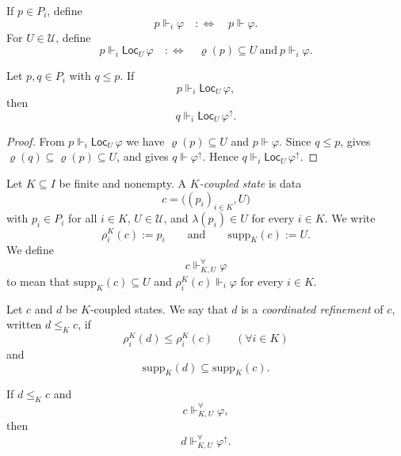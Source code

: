 \begin{definition}\label{def:regional-forcing}
If $p\in P_i$, define
\[
p\Vdash_i\varphi
\quad:\Longleftrightarrow\quad
p\Vdash\varphi.
\]
For $U\in\mathcal{U}$, define
\[
p\Vdash_i \mathsf{Loc}_U\,\varphi
\quad:\Longleftrightarrow\quad
\varrho(p)\subseteq U\ \text{and}\ p\Vdash_i\varphi.
\]
\end{definition}

\begin{proposition}\label{prop:regional-forcing-persistence}
Let $p,q\in P_i$ with $q\le p$. If
\[
p\Vdash_i \mathsf{Loc}_U\,\varphi,
\]
then
\[
q\Vdash_i \mathsf{Loc}_U\,\varphi^\uparrow.
\]
\end{proposition}

\begin{proof}
From $p\Vdash_i \mathsf{Loc}_U\,\varphi$ we have $\varrho(p)\subseteq U$ and $p\Vdash\varphi$. Since $q\le p$,  gives $\varrho(q)\subseteq\varrho(p)\subseteq U$, and  gives $q\Vdash\varphi^\uparrow$. Hence $q\Vdash_i \mathsf{Loc}_U\,\varphi^\uparrow$.
\end{proof}

\begin{definition}\label{def:coupled-states}
Let $K\subseteq I$ be finite and nonempty. A \emph{$K$-coupled state} is data
\[
c=\bigl((p_i)_{i\in K},U\bigr)
\]
with $p_i\in P_i$ for all $i\in K$, $U\in\mathcal{U}$, and $\lambda(p_i)\in U$ for every $i\in K$. We write
\[
\rho_i^K(c):=p_i
\qquad\text{and}\qquad
\mathrm{supp}_K(c):=U.
\]
We define
\[
c\Vdash^{\forall}_{K,U}\varphi
\]
to mean that $\mathrm{supp}_K(c)\subseteq U$ and $\rho_i^K(c)\Vdash_i\varphi$ for every $i\in K$.
\end{definition}

\begin{definition}\label{def:coordinated-refinement}
Let $c$ and $d$ be $K$-coupled states. We say that $d$ is a \emph{coordinated refinement} of $c$, written $d\le_K c$, if
\[
\rho_i^K(d)\le \rho_i^K(c)
\qquad (\forall i\in K)
\]
and
\[
\mathrm{supp}_K(d)\subseteq \mathrm{supp}_K(c).
\]
\end{definition}

\begin{proposition}\label{prop:shared-forcing-persistence}
If $d\le_K c$ and
\[
c\Vdash^{\forall}_{K,U}\varphi,
\]
then
\[
d\Vdash^{\forall}_{K,U}\varphi^\uparrow.
\]
\end{proposition}

